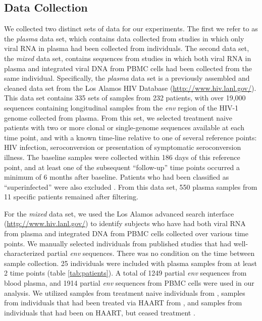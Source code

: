 \subsection * {Data Collection} \label{subsec:dcollection}
We collected two distinct sets of data for our experiments. The first we refer to as the {\em plasma} data set, which contains data collected from studies in which only viral RNA in plasma had been collected from individuals. 
The second data set, the {\em mixed} data set, contains sequences from studies in which both viral RNA in plasma and integrated viral DNA from PBMC cells had been collected from the same individual.
Specifically, the {\em plasma} data set \citep{McCloskey14} is a previously assembled and cleaned data set from the Los Alamos HIV Database (\href{http://www.hiv.lanl.gov/}{http://www.hiv.lanl.gov/}). 
This data set contains 335 sets of samples from 232 patients, with over 19,000 sequences \citep{McCloskey14} containing longitudinal samples from the {\em env} region of the HIV-1 genome collected from plasma. 
From this set, we selected treatment naive patients with two or more clonal or single-genome sequences available at each time point, and with a known time-line relative to one of several reference points: HIV infection, seroconversion or presentation of symptomatic seroconversion illness. 
The baseline samples were collected within 186 days of this reference point, and at least one of the subsequent ``follow-up'' time points occurred a minimum of 6 months after baseline.
Patients who had been classified as ``superinfected'' were also excluded \citep{McCloskey14}. 
From this data set, 550 plasma samples from 11 specific patients remained after filtering.


For the {\em mixed} data set, we used the Los Alamos advanced search interface (\href{http://www.hiv.lanl.gov/}{http://www.hiv.lanl.gov/}) to identify subjects who have had both viral RNA from plasma and integrated DNA from PBMC cells collected over various time points. We manually selected individuals from published studies that had well-characterized partial {\em env} sequences. 
There was no condition on the time between sample collection. 
25 individuals were included with plasma samples from at least 2 time points (table \ref{tab:patients}).
A total of 1249 partial {\em env} sequences from blood plasma, and 1914 partial {\em env} sequences from PBMC cells were used in our analysis. 
We utilized samples from treatment naive individuals from \cite{Shankarappa99, Novitsky09}, samples from individuals that had been treated via HAART from \cite{Llewellyn06}, and samples from individuals that had been on HAART, but ceased treatment \cite{Fischer04}. 
 
